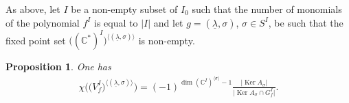 \documentclass[pdftex]{sigma}
\numberwithin{equation}{section}
\newtheorem{Proposition}[Theorem]{Proposition}
 { \theoremstyle{definition}
\newtheorem{Definition}[Theorem]{Definition}
\newtheorem{Remark}[Theorem]{Remark} }
\begin{document}
As above, let $I$ be a non-empty subset of $I_0$ such that the number of monomials of the polynomial $f^I$ is equal
to $|I|$ and let $g=(\underline{\lambda}, \sigma)$, $\sigma \in S^I$, be such that the fixed point set
$\big(({\mathbb C}^*)^I\big)^{\langle (\underline{\lambda}, \sigma) \rangle}$ is non-empty.

\begin{Proposition} \label{prop:Euler} One has
\begin{gather} \label{eq:Euler}
\chi\big(\big(V_f^I\big)^{\langle (\underline{\lambda}, \sigma) \rangle}\big) =
(-1)^{\dim \left({\mathbb C}^I\right)^{\langle \sigma \rangle} -1} \frac{|\operatorname{Ker} A_\sigma|}{\big|\operatorname{Ker} A_\sigma \cap G_f^I\big|}.
\end{gather}
\end{Proposition}
\end{document}
